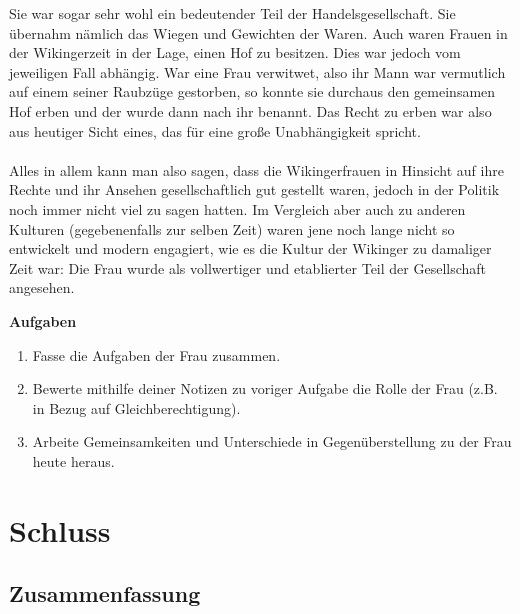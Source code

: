 \documentclass[12pt,a4paper,ngerman,openany]{book}
\newcommand{\aufgaben}[1]{
  \begin{tcolorbox}
    \textbf{Aufgaben}
    \begin{enumerate}
      #1
    \end{enumerate}
  \end{tcolorbox}
} %
\newcommand{\fchapter}[1]{\chapter{#1}\thispagestyle{chapterstyle}}
\begin{document}
Sie war sogar sehr wohl ein bedeutender Teil der Handelsgesellschaft. Sie übernahm nämlich das Wiegen und Gewichten der Waren. 
Auch waren Frauen in der Wikingerzeit in der Lage, einen Hof zu besitzen. Dies war jedoch vom jeweiligen Fall abhängig. War eine Frau verwitwet, also ihr Mann war vermutlich auf einem seiner Raubzüge gestorben, so konnte sie durchaus den gemeinsamen Hof erben und der wurde dann nach ihr benannt. Das Recht zu erben war also aus heutiger Sicht eines, das für eine große Unabhängigkeit spricht.\\\\
Alles in allem kann man also sagen, dass die Wikingerfrauen in Hinsicht auf ihre Rechte und ihr Ansehen gesellschaftlich gut gestellt waren, jedoch in der Politik noch immer nicht viel zu sagen hatten. Im Vergleich aber auch zu anderen Kulturen (gegebenenfalls zur selben Zeit) waren jene noch lange nicht so entwickelt und modern engagiert, wie es die Kultur der Wikinger zu damaliger Zeit war:
Die Frau wurde als vollwertiger und etablierter Teil der Gesellschaft angesehen.

\aufgaben{
  \item Fasse die Aufgaben der Frau zusammen.
  \item Bewerte mithilfe deiner Notizen zu voriger Aufgabe die Rolle der Frau (z.B. in Bezug auf Gleichberechtigung).
  \item Arbeite Gemeinsamkeiten und Unterschiede in Gegenüberstellung zu der Frau heute heraus.
}

\fchapter{Schluss}

\section{Zusammenfassung}

\end{document}
